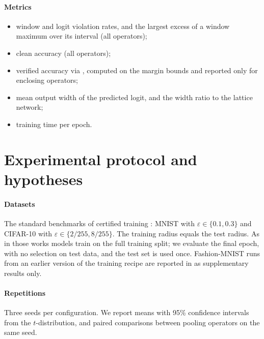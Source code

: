 \documentclass[preprint,12pt]{elsarticle}
\theoremstyle{definition}
\newcommand{\eps}{\varepsilon}
\begin{document}
\paragraph{Metrics}
\begin{itemize}
\item window and logit violation rates, and the largest excess of a window maximum over its interval (all operators);
\item clean accuracy (all operators);
\item verified accuracy via , computed on the margin bounds and reported only for enclosing operators;
\item mean output width of the predicted logit, and the width ratio to the lattice network;
\item training time per epoch.
\end{itemize}

\section{Experimental protocol and hypotheses}
\label{sec:protocol}

\paragraph{Datasets} The standard benchmarks of certified training \cite{shi2021,mao2024ctbench}: MNIST \cite{lecun1998} with $\eps\in\{0.1,0.3\}$ and CIFAR-10 \cite{krizhevsky2009} with $\eps\in\{2/255,8/255\}$. The training radius equals the test radius. As in those works models train on the full training split; we evaluate the final epoch, with no selection on test data, and the test set is used once. Fashion-MNIST \cite{xiao2017fmnist} runs from an earlier version of the training recipe are reported in  as supplementary results only.

\paragraph{Repetitions} Three seeds per configuration. We report means with 95\% confidence intervals from the $t$-distribution, and paired comparisons between pooling operators on the same seed.
\end{document}
